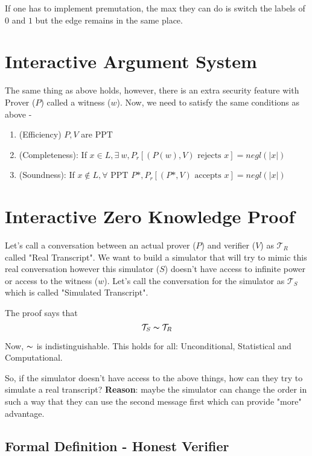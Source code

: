 \documentclass{article}
\begin{document}
If one has to implement premutation, the max they can do is switch the labels of $0$ and $1$ but the edge remains in the same place.

\section{Interactive Argument System}

The same thing as above holds, however, there is an extra security feature with Prover ($P$) called a witness ($w$). Now, we need to satisfy the same conditions as above - 

\begin{enumerate}
    \item (Efficiency) $P,V$ are PPT
    \item (Completeness): If $x \in L, \exists \: w, P_r[(P(w),V) \text{ rejects } x] = negl(|x|)$
    \item (Soundness): If $x \notin L, \forall \text{ PPT } P*, P_r[(P*,V) \text{ accepts } x] = negl(|x|)$
\end{enumerate}

\section{Interactive Zero Knowledge Proof}

Let's call a conversation between an actual prover ($P$) and verifier ($V$) as $\mathcal{T}_{R}$ called "Real Transcript". We want to build a simulator that will try to mimic this real conversation however this simulator ($S$) doesn't have access to infinite power or access to the witness ($w$). Let's call the conversation for the simulator as $\mathcal{T}_{S}$ which is called "Simulated Transcript".

The proof says that $$\mathcal{T}_{S} \thicksim \mathcal{T}_{R}$$

Now, $\thicksim$ is indistinguishable. This holds for all: Unconditional, Statistical and Computational.

So, if the simulator doesn't have access to the above things, how can they try to simulate a real transcript? \textbf{Reason}: maybe the simulator can change the order in such a way that they can use the second message first which can provide "more" advantage.

\subsection{Formal Definition - Honest Verifier}
\end{document}
